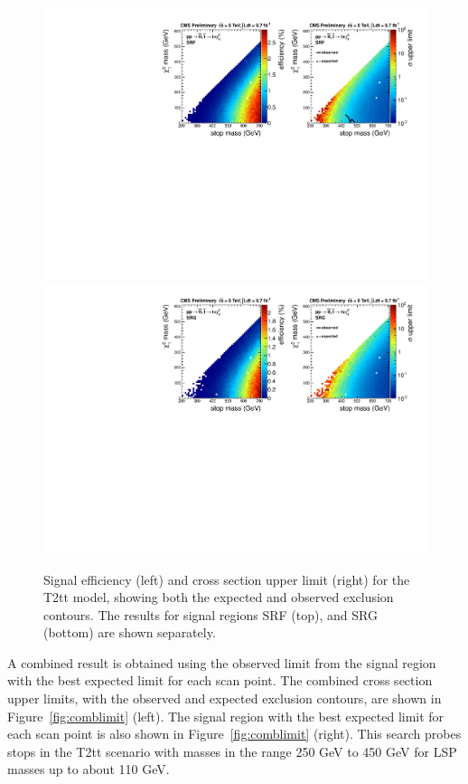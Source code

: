 \begin{figure}[hbt]
  \begin{center}
        \includegraphics[width=1.\linewidth]{plots/T2tt_SRF.pdf}
        \includegraphics[width=1.\linewidth]{plots/T2tt_SRG.pdf}
    \caption{Signal efficiency (left) and cross section upper limit
      (right) for the T2tt model, showing both the expected and
      observed exclusion contours. The results for signal regions SRF (top),
      and SRG (bottom) are shown separately.}
\label{fig:allsrlimits3}
      \end{center}
\end{figure}

A combined result is obtained using the observed limit from the signal
region with the best expected limit for each scan point. The combined cross
section upper limits, with the observed and expected exclusion contours, are
shown in Figure~\ref{fig:comblimit} (left).
The signal region with the best expected limit for each scan point is
also shown in Figure~\ref{fig:comblimit} (right). This search probes
stops in the T2tt scenario with masses in the range 250 GeV to 450 GeV for LSP masses up to
about 110 GeV.

